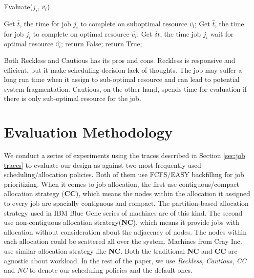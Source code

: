 \documentclass[conference]{IEEEtran}
\begin{document}
\begin{algorithm}
  \label {alg: Evaluate}
  \caption{Evaluate($j_i$, $\bar{v_i}$)}
  \begin{algorithmic}
    \State Get $\bar{t}$, the time for job $j_i$ to complete on suboptimal resource $\bar{v_i}$;
    \State Get $\hat{t}$, the time for job $j_i$ to complete on optimal resource $\hat{v_i}$;
    \State Get $\delta{t}$, the time job $j_i$ wait for optimal resource $\hat{v_i}$;
        \State return False;
    \Else
        \State return True;
    \EndIf
    
  \end{algorithmic}
\end{algorithm}

Both Reckless and Cautious has its pros and cons. Reckless is responsive and efficient, but it make scheduling decision lack of thoughts. The job may suffer a long run time when it assign to sub-optimal resource and can lead to potential system fragmentation. Cautious, on the other hand, spends time for evaluation if there is only sub-optimal resource for the job. 



\section{Evaluation Methodology}
\label{sec: evaluation methodology}

We conduct a series of experiments using the traces described in Section \ref{sec:job traces} to evaluate our design as against two most frequently used scheduling/allocation policies. Both of them use FCFS/EASY backfilling for job prioritizing. When it comes to job allocation, the first use contiguous/compact allocation strategy (\textbf{CC}), which means the nodes within the allocation it assigned to every job are spacially contiguous and compact. The partition-based allocation strategy used in IBM Blue Gene series of machines are of this kind. The second use non-contiguous allocation strategy(\textbf{NC}), which means it provide jobs with allocation without consideration about the adjacency of nodes. The nodes within each allocation could be scattered all over the system. Machines from Cray Inc. use similar allocation strategy like \textbf{NC}. Both the traditional \textbf{NC} and \textbf{CC} are agnostic about workload. In the rest of the paper, we use \emph{Reckless}, \emph{Cautious}, \emph{CC} and \emph{NC} to denote our scheduling policies and the default ones.
\end{document}
